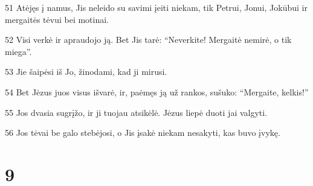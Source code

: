 \par 51 Atėjęs į namus, Jis neleido su savimi įeiti niekam, tik Petrui, Jonui, Jokūbui ir mergaitės tėvui bei motinai. 
\par 52 Visi verkė ir apraudojo ją. Bet Jis tarė: “Neverkite! Mergaitė nemirė, o tik miega”. 
\par 53 Jie šaipėsi iš Jo, žinodami, kad ji mirusi. 
\par 54 Bet Jėzus juos visus išvarė, ir, paėmęs ją už rankos, sušuko: “Mergaite, kelkis!” 
\par 55 Jos dvasia sugrįžo, ir ji tuojau atsikėlė. Jėzus liepė duoti jai valgyti. 
\par 56 Jos tėvai be galo stebėjosi, o Jis įsakė niekam nesakyti, kas buvo įvykę.



\chapter{9}


